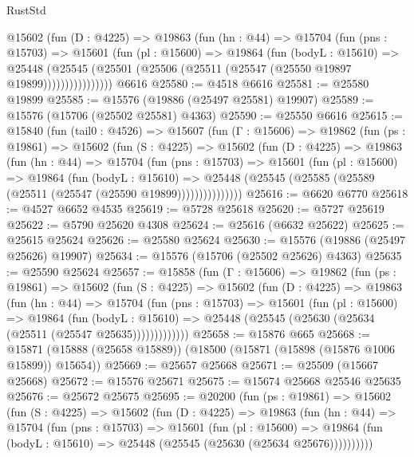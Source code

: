 \begin{lexlean}{RustStd}
\begin{coremodule}
            @15602
              (fun (D : @4225) =>
              @19863
                (fun (hn : @44) =>
                @15704
                  (fun (pns : @15703) =>
                  @15601
                    (fun (pl : @15600) =>
                    @19864
                      (fun (bodyL : @15610) =>
                      @25448
                        (@25545
                          (@25501 (@25506 (@25511 (@25547 (@25550 @19897 @19899))))))))))))))))
    @6616
@25580 := @4518 @6616
@25581 := @25580 @19899
@25585 := @15576 (@19886 (@25497 @25581) @19907)
@25589 := @15576 (@15706 (@25502 @25581) @4363)
@25590 := @25550 @6616
@25615 := @15840
    (fun (tail0 : @4526) =>
    @15607
      (fun (Γ : @15606) =>
      @19862
        (fun (ps : @19861) =>
        @15602
          (fun (S : @4225) =>
          @15602
            (fun (D : @4225) =>
            @19863
              (fun (hn : @44) =>
              @15704
                (fun (pns : @15703) =>
                @15601
                  (fun (pl : @15600) =>
                  @19864
                    (fun (bodyL : @15610) =>
                    @25448 (@25545 (@25585 (@25589 (@25511 (@25547 (@25590 @19899)))))))))))))))
@25616 := @6620 @6770
@25618 := @4527 @6652 @4535
@25619 := @5728 @25618
@25620 := @5727 @25619
@25622 := @5790 @25620 @4308
@25624 := @25616 (@6632 @25622)
@25625 := @25615 @25624
@25626 := @25580 @25624
@25630 := @15576 (@19886 (@25497 @25626) @19907)
@25634 := @15576 (@15706 (@25502 @25626) @4363)
@25635 := @25590 @25624
@25657 := @15858
    (fun (Γ : @15606) =>
    @19862
      (fun (ps : @19861) =>
      @15602
        (fun (S : @4225) =>
        @15602
          (fun (D : @4225) =>
          @19863
            (fun (hn : @44) =>
            @15704
              (fun (pns : @15703) =>
              @15601
                (fun (pl : @15600) =>
                @19864
                  (fun (bodyL : @15610) =>
                  @25448 (@25545 (@25630 (@25634 (@25511 (@25547 @25635)))))))))))))
@25658 := @15876 @665
@25668 := @15871 (@15888 (@25658 @15889)) (@18500 (@15871 (@15898 (@15876 @1006 @15899)) @15654))
@25669 := @25657 @25668
@25671 := @25509 (@15667 @25668)
@25672 := @15576 @25671
@25675 := @15674 @25668 @25546 @25635
@25676 := @25672 @25675
@25695 := @20200
    (fun (ps : @19861) =>
    @15602
      (fun (S : @4225) =>
      @15602
        (fun (D : @4225) =>
        @19863
          (fun (hn : @44) =>
          @15704
            (fun (pns : @15703) =>
            @15601
              (fun (pl : @15600) =>
              @19864 (fun (bodyL : @15610) => @25448 (@25545 (@25630 (@25634 @25676))))))))))

\end{coremodule}
\end{lexlean}
